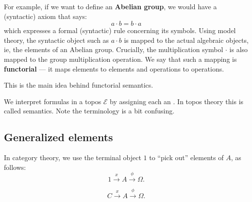 For example, if we want to define an \textbf{Abelian group}, we would have a (syntactic) axiom that says:
\begin{equation}
a \cdot b = b \cdot a
\end{equation}
which expresses a formal (syntactic) rule concerning its symbols.  Using model theory, the syntactic object such as $a \cdot b$ is mapped to the actual algebraic objects, ie, the elements of an Abelian group.  Crucially, the multiplication symbol $\cdot$ is also mapped to the group multiplication operation.  We say that such a mapping is \textbf{functorial} --- it maps elements to elements and operations to operations.

This is the main idea behind functorial semantics.

We interpret formulas in a topos $\mathcal{E}$ by assigning each an .  In topos theory this is called  semantics.  Note the terminology is a bit confusing.

\subsection{Generalized elements}


In category theory, we use the terminal object $1$ to ``pick out'' elements of $A$, as follows:
\begin{equation}
1 \stackrel{x}{\rightarrow} A \stackrel{\phi}{\rightarrow} \Omega.
\end{equation}

\begin{equation}
C \stackrel{x}{\rightarrow} A \stackrel{\phi}{\rightarrow} \Omega.
\end{equation}

